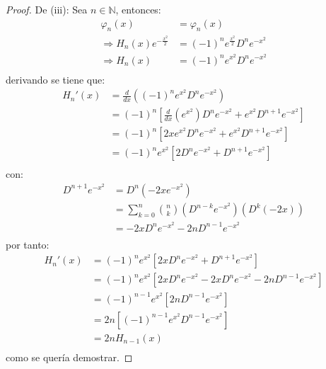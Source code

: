 \documentclass[12pt]{report}
\newcounter{it}
\theoremstyle{largebreak}
\begin{document}
\begin{proof}
        De (iii): Sea $n\in\mathbb{N}$, entonces:
        \begin{equation*}
            \begin{split}
                \varphi_n(x)&=\varphi_n(x)\\
                \Rightarrow H_n(x)e^{-\frac{x^2}{2}}&=(-1)^{n}e^{\frac{x^2}{2}}D^ne^{-x^2}\\
                \Rightarrow H_n(x)&=(-1)^{n}e^{x^2} D^ne^{-x^2}\\
            \end{split}
        \end{equation*}
        derivando se tiene que:
        \begin{equation*}
            \begin{split}
                H_n'(x)&=\frac{d}{dx}\left((-1)^{n}e^{x^2} D^ne^{-x^2}\right) \\
                &=(-1)^{n}\left[\frac{d}{dx}\left(e^{x^2}\right)D^ne^{-x^2}+e^{x^2}D^{n+1} e^{-x^2}\right] \\
                &=(-1)^{n}\left[2xe^{x^2}D^ne^{-x^2}+e^{x^2}D^{n+1} e^{-x^2}\right] \\
                &=(-1)^{n}e^{x^2}\left[2D^ne^{-x^2}+D^{n+1} e^{-x^2}\right] \\
            \end{split}
        \end{equation*}
        con:
        \begin{equation*}
            \begin{split}
                D^{n+1} e^{-x^2}&=D^n(-2xe^{-x^2})\\
                &=\sum_{ k=0}^n \binom{n}{k}(D^{ n-k}e^{-x^2})(D^k(-2x)) \\
                &=-2x D^ne^{-x^2}-2nD^{ n-1}e^{-x^2}\\
            \end{split}
        \end{equation*}
        por tanto:
        \begin{equation*}
            \begin{split}
                H_n'(x)&=(-1)^{n}e^{x^2}\left[2xD^ne^{-x^2}+D^{n+1} e^{-x^2}\right] \\
                &=(-1)^{n}e^{x^2}\left[2xD^ne^{-x^2}-2x D^ne^{-x^2}-2nD^{ n-1}e^{-x^2}\right] \\
                &=(-1)^{n-1}e^{x^2}\left[2nD^{ n-1}e^{-x^2}\right] \\
                &=2n\left[(-1)^{n-1}e^{x^2}D^{ n-1}e^{-x^2}\right] \\
                &=2nH_{n-1}(x)\\
            \end{split}
        \end{equation*}
        como se quería demostrar.


\end{proof}
\end{document}
